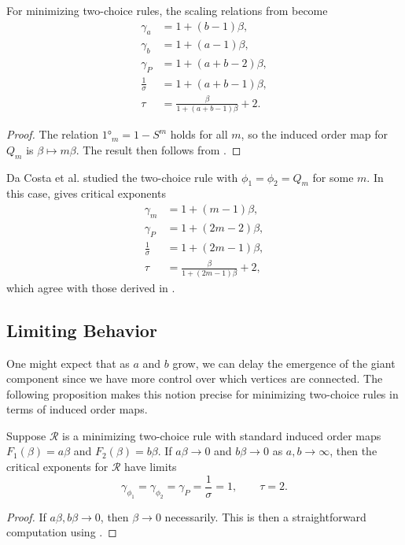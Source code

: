 \documentclass[twoside,10pt]{article}
\begin{document}
\begin{cor}
	\label{2c-minimizing-scaling-relations}
	For minimizing two-choice rules, the scaling relations from  become
\begin{align*}
        \gamma_{a} &= 1 + (b-1)\beta,\\
        \gamma_{b} &= 1+(a-1)\beta,\\
        \gamma_{P} &= 1+(a+b-2)\beta,\\
        \frac{1}{\sigma} &= 1+(a+b-1)\beta,\\
        \tau &= \frac{\beta}{1+(a+b-1)\beta} +2.
\end{align*}
\end{cor}
\begin{proof}
	The relation $\ang{1}_{m} = 1 - S^{m}$ holds for all $m$, so the induced order map for $Q_{m}$ is $\beta \mapsto m \beta$. The result then follows from .
\end{proof}

\begin{ex}
	Da Costa et al. \cite{daCosta} studied the two-choice rule with $\phi_1=\phi_2=Q_{m}$ for some $m$. In this case,  gives critical exponents
	\begin{align*}
		\gamma_{m} &= 1 + (m-1)\beta,\\
		\gamma_{P} &= 1 + (2m-2)\beta,\\
		\frac{1}{\sigma} &= 1 + (2m-1)\beta,\\
		\tau &= \frac{\beta}{1 + (2m-1)\beta} +2,
	\end{align*}
	which agree with those derived in \cite{daCosta}.
\end{ex}

\subsection{Limiting Behavior}

One might expect that as $a$ and $b$ grow, we can delay the emergence of the giant component since we have more control over which vertices are connected. The following proposition makes this notion precise for minimizing two-choice rules in terms of induced order maps.

\begin{prop}
	\label{2c-limits}
	Suppose $\mathcal{R}$ is a minimizing two-choice rule with standard induced order maps $F_1(\beta) = a\beta$ and $F_2(\beta)=b \beta$. If $a \beta\to 0$ and $b \beta\to 0$ as $a,b\to \infty$, then the critical exponents for $\mathcal{R}$ have limits
	\[
		\gamma_{\phi_1} = \gamma_{\phi_2} = \gamma_{P} = \frac{1}{\sigma} = 1, \qquad \tau = 2.
	\]
\end{prop}
\begin{proof}
	If $a\beta, b\beta \to 0$, then $\beta\to 0$ necessarily. This is then a straightforward computation using .
\end{proof}
\end{document}
